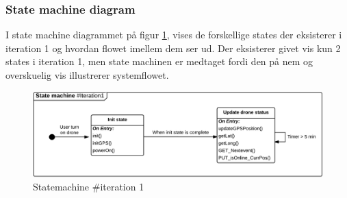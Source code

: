 \subsubsection*{State machine diagram}
\vspace{-0.1cm}
I state machine diagrammet på figur \ref{fig:Statemachine_iteration1}, vises de forskellige states der eksisterer i iteration 1 og hvordan flowet imellem dem ser ud. Der eksisterer givet vis kun 2 states i iteration 1, men state machinen er medtaget fordi den på nem og overskuelig vis illustrerer systemflowet.
\begin{figure}[H]
	\centering
	\includegraphics[width=1\textwidth]{Billeder/statemachine/State_iteration1.png}
	\vspace{-0.5cm}
	\caption{Statemachine \#iteration 1}
	\label{fig:Statemachine_iteration1}
\end{figure}